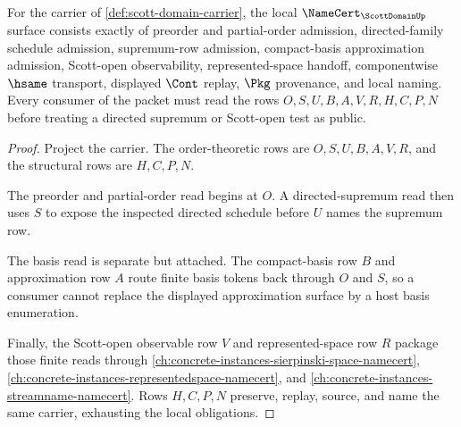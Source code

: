 \begin{theorem}\label{thm:scott-domain-namecert-obligations}
For the carrier of \autoref{def:scott-domain-carrier}, the local $\NameCert_{\ScottDomainUp}$ surface consists exactly of preorder and partial-order admission, directed-family schedule admission, supremum-row admission, compact-basis approximation admission, Scott-open observability, represented-space handoff, componentwise $\hsame$ transport, displayed $\Cont$ replay, $\Pkg$ provenance, and local naming. Every consumer of the packet must read the rows $O,S,U,B,A,V,R,H,C,P,N$ before treating a directed supremum or Scott-open test as public.
\end{theorem}
\begin{proof}
Project the carrier. The order-theoretic rows are $O,S,U,B,A,V,R$, and the structural rows are $H,C,P,N$.

The preorder and partial-order read begins at $O$. A directed-supremum read then uses $S$ to expose the inspected directed schedule before $U$ names the supremum row.

The basis read is separate but attached. The compact-basis row $B$ and approximation row $A$ route finite basis tokens back through $O$ and $S$, so a consumer cannot replace the displayed approximation surface by a host basis enumeration.

Finally, the Scott-open observable row $V$ and represented-space row $R$ package those finite reads through \autoref{ch:concrete-instances-sierpinski-space-namecert}, \autoref{ch:concrete-instances-representedspace-namecert}, and \autoref{ch:concrete-instances-streamname-namecert}. Rows $H,C,P,N$ preserve, replay, source, and name the same carrier, exhausting the local obligations.
\end{proof}

